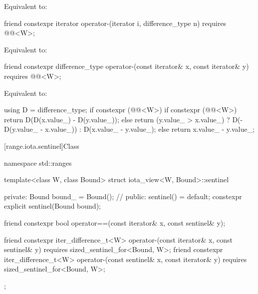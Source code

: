 \begin{itemdescr}
\pnum
\effects
Equivalent to: 
\end{itemdescr}

\begin{itemdecl}
friend constexpr iterator operator-(iterator i, difference_type n)
  requires @@<W>;
\end{itemdecl}

\begin{itemdescr}
\pnum
\effects
Equivalent to: 
\end{itemdescr}

\begin{itemdecl}
friend constexpr difference_type operator-(const iterator& x, const iterator& y)
  requires @@<W>;
\end{itemdecl}

\begin{itemdescr}
\pnum
\effects
Equivalent to:
\begin{codeblock}
using D = difference_type;
if constexpr (@@<W>) {
  if constexpr (@@<W>)
    return D(D(x.value_) - D(y.value_));
  else
    return (y.value_ > x.value_)
      ? D(-D(y.value_ - x.value_))
      : D(x.value_ - y.value_);
} else {
  return x.value_ - y.value_;
}
\end{codeblock}
\end{itemdescr}

[range.iota.sentinel]{Class }

%
\begin{codeblock}
namespace std::ranges {
  template<class W, class Bound>
  struct iota_view<W, Bound>::sentinel {
  private:
    Bound bound_ = Bound();     // \expos
  public:
    sentinel() = default;
    constexpr explicit sentinel(Bound bound);

    friend constexpr bool operator==(const iterator& x, const sentinel& y);

    friend constexpr iter_difference_t<W> operator-(const iterator& x, const sentinel& y)
      requires sized_sentinel_for<Bound, W>;
    friend constexpr iter_difference_t<W> operator-(const sentinel& x, const iterator& y)
      requires sized_sentinel_for<Bound, W>;
  };
}
\end{codeblock}


